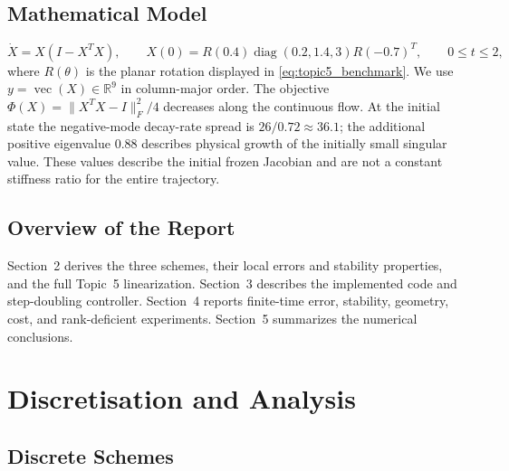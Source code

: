\documentclass[11pt,a4paper]{article}
\theoremstyle{definition}
\theoremstyle{remark}
\begin{document}
\subsection{Mathematical Model}
\begin{equation}
\label{eq:intro_model}
\dot X=X(I-X^TX),\qquad
X(0)=R(0.4)\operatorname{diag}(0.2,1.4,3)R(-0.7)^T,\qquad 0\leq t\leq2,
\end{equation}
where $R(\theta)$ is the planar rotation displayed in
\eqref{eq:topic5_benchmark}. We use
$y=\operatorname{vec}(X)\in\mathbb R^9$ in column-major order.
The objective $\Phi(X)=\|X^TX-I\|_F^2/4$ decreases along the continuous
flow. At the initial state the negative-mode decay-rate spread is
$26/0.72\approx36.1$; the additional positive eigenvalue $0.88$
describes physical growth of the initially small singular value.
These values describe the initial frozen Jacobian and are not a
constant stiffness ratio for the entire trajectory.

\subsection{Overview of the Report}
Section~2 derives the three schemes, their local errors and stability
properties, and the full Topic~5 linearization. Section~3 describes the
implemented code and step-doubling controller. Section~4 reports
finite-time error, stability, geometry, cost, and rank-deficient
experiments. Section~5 summarizes the numerical conclusions.

\newpage
\section{Discretisation and Analysis}

\subsection{Discrete Schemes}
\label{sec:discrete_schemes}
\end{document}
